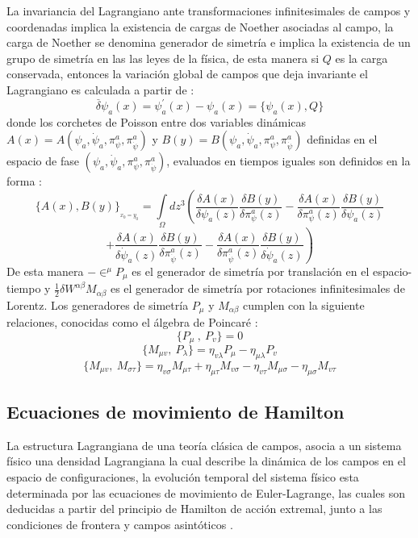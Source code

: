 \documentclass[a4paper,12pt]{article}
\begin{document}
La invariancia del Lagrangiano ante transformaciones infinitesimales de campos y coordenadas implica la existencia de cargas de Noether asociadas al campo, la carga de Noether se denomina generador de simetría e implica la existencia de un grupo de simetría en las las leyes de la física, de esta manera si $Q$ es la carga conservada, entonces la variación global de campos que deja invariante el Lagrangiano es calculada a partir de \cite{greiner}:
\begin{equation}
\overset{\_}{\delta}\psi_a(x)=\psi_a^{'}(x)-\psi_a(x)=\{ \psi_a(x),Q \} 
\end{equation}
donde los corchetes de Poisson entre dos variables dinámicas \mbox{$A(x)=A(\psi_a,\dot\psi_a,\pi^{a}_{\psi},\pi^{a}_{\dot\psi})$} y \mbox{$B(y)=B(\psi_a,\dot\psi_a,\pi^{a}_{\psi},\pi^{a}_{\dot\psi})$} definidas en el espacio de fase $(\psi_a,\dot\psi_a,\pi^{a}_{\psi},\pi^{a}_{\dot\psi})$, evaluados en tiempos iguales son definidos en la forma \cite{general, greiner}:
\begin{equation}
\{A(x),B(y)\}_{_{x_0=y_0}}=\int\limits_{\Omega}dz^3\left(\frac{\delta A(x)}{\delta\psi_a(z)}\frac{\delta B(y)}{\delta \pi^{a}_{\psi}(z) }-\frac{\delta A(x)}{\delta \pi^{a}_{\psi}(z) }\frac{\delta B(y)}{\delta\psi_a(z)}\right.
\label{cor}
\end{equation}
$$\left.+\frac{\delta A(x)}{\delta \dot\psi_{a}(z)}\frac{\delta B(y)}{\delta \pi^{a}_{\dot\psi}(z)}-\frac{\delta A(x)}{\delta \pi^{a}_{\dot\psi}(z)}\frac{\delta B(y)}{\delta \dot\psi_{a}(z) }\right)$$
De esta manera \mbox{$-\in^{\mu}P_{\mu}$} es el generador de simetría por translación en el \mbox{espacio-tiempo} y $\frac{1}{2}\delta W^{\alpha\beta}M_{\alpha\beta}$ es el generador de simetría por rotaciones \mbox{infinitesimales} de Lorentz. Los generadores de simetría $P_{\mu}$ y $M_{\alpha\beta}$ cumplen con la siguiente relaciones, conocidas como el álgebra de Poincaré \cite{greiner}:
\begin{equation}
\{P_\mu\ ,\ P_v\}=0  
\end{equation}
$$\{M_{\mu v} ,\ P_\lambda\}=\eta_{v\lambda}P_\mu-\eta_{\mu\lambda}P_v$$ 
$$\{M_{\mu v} ,\ M_{\sigma\tau}\}=\eta_{v\sigma}M_{\mu \tau}+\eta_{\mu\tau}M_{v\sigma}-\eta_{v\tau}M_{\mu\sigma}-\eta_{\mu\sigma}M_{v \tau}$$
\subsection{Ecuaciones de movimiento de Hamilton}
La estructura Lagrangiana de una teoría clásica de campos, asocia a un sistema físico una densidad Lagrangiana la cual describe la dinámica de los campos en el espacio de configuraciones, la evolución temporal del sistema físico esta \mbox{determinada} por las ecuaciones de movimiento de Euler-Lagrange, las cuales son deducidas a partir del principio de Hamilton de acción extremal, junto a las condiciones de frontera y campos asintóticos \cite{general, greiner,canoalor,tesis}. 
\\
\end{document}
